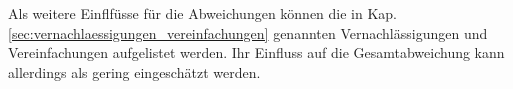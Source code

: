 Als weitere Einflfüsse für die Abweichungen können die in Kap. \ref{sec:vernachlaessigungen_vereinfachungen} genannten Vernachlässigungen und Vereinfachungen aufgelistet werden. Ihr Einfluss auf die Gesamtabweichung kann allerdings als gering eingeschätzt werden.





